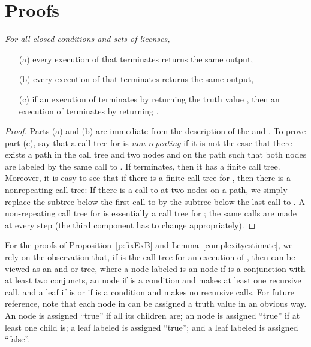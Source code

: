 \documentclass{acmtrans2m}
\newcommand{\prf}{\begin{proof}}
\newcommand{\eprf}{\end{proof}}
\newenvironment{RETHM}[2]{\trivlist \item[\hskip 10pt\hskip\labelsep{\sc #1\hskip 5pt\relax\ref{#2}.}]\it}{\endtrivlist}
\newcommand{\repro}[1]{\begin{RETHM}{Proposition}{#1}}
\newcommand{\erepro}{\end{RETHM}}
\newcommand{\opro}{\repro}
\newcommand{\eopro}{\erepro}
\newcommand{\<}{
}
\renewcommand{\>}{\rangle}
\begin{document}
\appendix
\section{Proofs}
\opro{t:correct2}
For all closed conditions  and sets  of licenses,
\begin{itemize}
\item[(a)] every execution of  that terminates returns the same output,
\item[(b)] every execution of  that terminates returns the same output,
\item[(c)] if an execution of  terminates by returning the truth value , then
an execution of  terminates by returning .
\end{itemize}
\eopro
\prf
Parts (a) and (b) are immediate from the description of the  and .
To prove part (c), say that a call tree for  is \emph{non-repeating}
if it is not the case that there exists a path  in the call tree and two nodes
 and  on the path such that both nodes are labeled by the same call to
.  If  terminates, then it has a finite call tree.  Moreover,
it is easy to see that if there is a finite call tree for , then
there is a nonrepeating call tree:  If there is a call to  at two
nodes on a path, we simply replace the subtree below the first call to
 by the subtree below the last call to .  A
non-repeating call tree for  is essentially a call tree for
; the same calls are made at every step (the third
component has to change appropriately).
\eprf

For the proofs of Proposition~\ref{p:fixExB} and Lemma~\ref{complexityestimate}, we
rely on the observation that, if  is the call tree for an execution of
, then  can be viewed as an and-or tree, where a node labeled
 is an  node if  is a conjunction with at least
two conjuncts, an  node if  is a  condition and
 makes at least one recursive call, and a leaf if  is
 or if  is a  condition and  makes no
recursive calls.  For future reference, note that each node in  can be assigned a
truth value in an obvious way.  An  node is assigned ``true'' if all its
children are; an  node is assigned ``true'' if at least one child is; a leaf
labeled  is assigned ``true''; and a leaf labeled
 is assigned ``false''.
\end{document}

